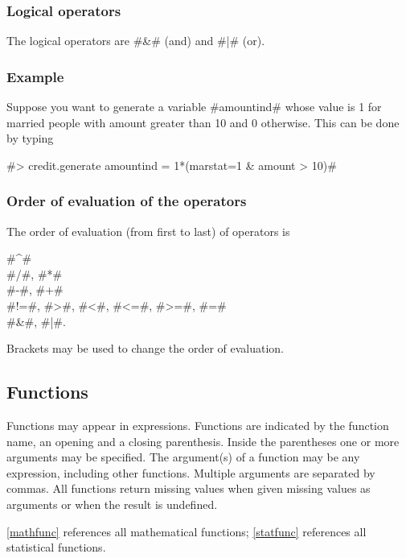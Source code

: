 \subsubsection{Logical operators}

The logical operators are #&# (and) and #|# (or).

\subsubsection*{Example}

Suppose you want to generate a variable #amountind# whose value is
1 for married people with
amount greater than 10 and 0 otherwise. This can be done by typing

#> credit.generate amountind = 1*(marstat=1 & amount > 10)#

\subsubsection{Order of evaluation of the operators}

The order of evaluation (from first to last) of operators is

#^# \\
#/#, #*#\\
#-#, #+#\\
#!=#, #>#, #<#, #<=#, #>=#, #=#\\
#&#, #|#.

Brackets may be used to change the order of evaluation.


\subsection{Functions}

Functions may appear in expressions. Functions are indicated by
the function name, an opening and a closing parenthesis. Inside
the parentheses one or more arguments may be specified. The
argument(s) of a function may be any expression, including other
functions. Multiple arguments are separated by commas. All
functions return missing values when given missing values as
arguments or when the result is undefined.

\autoref{mathfunc} references all mathematical functions;
\autoref{statfunc} references all statistical functions.
  
 
 
   


